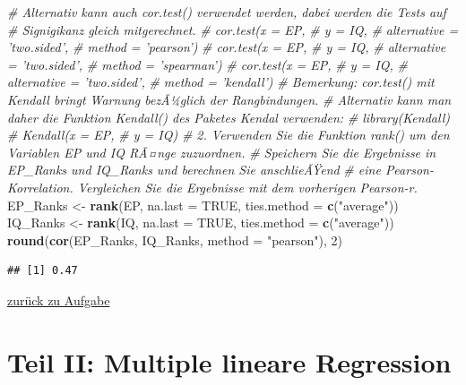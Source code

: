 \documentclass[]{article}
\newenvironment{Shaded}{\begin{snugshade}}{\end{snugshade}}
\newcommand{\CommentTok}[1]{\textcolor[rgb]{0.56,0.35,0.01}{\textit{#1}}}
\newcommand{\DataTypeTok}[1]{\textcolor[rgb]{0.13,0.29,0.53}{#1}}
\newcommand{\DecValTok}[1]{\textcolor[rgb]{0.00,0.00,0.81}{#1}}
\newcommand{\KeywordTok}[1]{\textcolor[rgb]{0.13,0.29,0.53}{\textbf{#1}}}
\newcommand{\NormalTok}[1]{#1}
\newcommand{\OtherTok}[1]{\textcolor[rgb]{0.56,0.35,0.01}{#1}}
\newcommand{\StringTok}[1]{\textcolor[rgb]{0.31,0.60,0.02}{#1}}
\begin{document}
\begin{Shaded}
\begin{Highlighting}[]
    \CommentTok{# Alternativ kann auch cor.test() verwendet werden, dabei werden die Tests auf}
    \CommentTok{# Signigikanz gleich mitgerechnet.}
    \CommentTok{# cor.test(x = EP, }
    \CommentTok{#          y = IQ, }
    \CommentTok{#          alternative = 'two.sided', }
    \CommentTok{#          method = 'pearson')    }
    \CommentTok{# cor.test(x = EP, }
    \CommentTok{#          y = IQ, }
    \CommentTok{#          alternative = 'two.sided', }
    \CommentTok{#          method = 'spearman')    }
    \CommentTok{# cor.test(x = EP, }
    \CommentTok{#          y = IQ, }
    \CommentTok{#          alternative = 'two.sided', }
    \CommentTok{#          method = 'kendall')    }
    \CommentTok{# Bemerkung: cor.test() mit Kendall bringt Warnung bezÃ¼glich der Rangbindungen.}
    \CommentTok{#            Alternativ kann man daher die Funktion Kendall() des Paketes Kendal verwenden:}
      \CommentTok{# library(Kendall)}
        \CommentTok{# Kendall(x = EP, }
        \CommentTok{#         y = IQ)}
    \CommentTok{# 2. Verwenden Sie die Funktion rank() um den Variablen EP und IQ RÃ¤nge zuzuordnen.}
    \CommentTok{#   Speichern Sie die Ergebnisse in EP_Ranks und IQ_Ranks und berechnen Sie anschlieÃŸend}
    \CommentTok{#   eine Pearson-Korrelation. Vergleichen Sie die Ergebnisse mit dem vorherigen Pearson-r.}
\NormalTok{    EP_Ranks <-}\StringTok{ }\KeywordTok{rank}\NormalTok{(EP, }\DataTypeTok{na.last =} \OtherTok{TRUE}\NormalTok{,}
                     \DataTypeTok{ties.method =} \KeywordTok{c}\NormalTok{(}\StringTok{"average"}\NormalTok{))}
\NormalTok{    IQ_Ranks <-}\StringTok{ }\KeywordTok{rank}\NormalTok{(IQ, }\DataTypeTok{na.last =} \OtherTok{TRUE}\NormalTok{,}
                     \DataTypeTok{ties.method =} \KeywordTok{c}\NormalTok{(}\StringTok{"average"}\NormalTok{))}
    \KeywordTok{round}\NormalTok{(}\KeywordTok{cor}\NormalTok{(EP_Ranks, IQ_Ranks, }\DataTypeTok{method =} \StringTok{"pearson"}\NormalTok{), }\DecValTok{2}\NormalTok{)}
\end{Highlighting}
\end{Shaded}

\begin{verbatim}
## [1] 0.47
\end{verbatim}

\protect\hyperlink{spearman-und-kendall}{zurück zu Aufgabe}

\hypertarget{part-teil-ii-multiple-lineare-regression}{%
\part*{Teil II: Multiple lineare Regression}\label{part-teil-ii-multiple-lineare-regression}}
\end{document}
